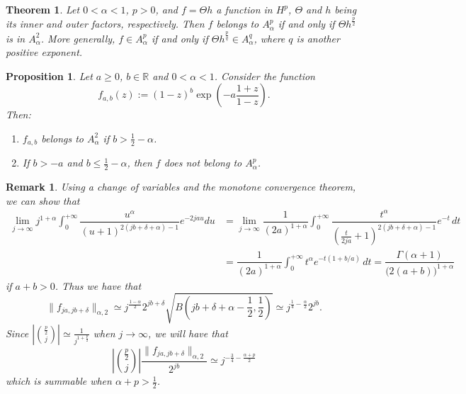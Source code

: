 \documentclass[10pt,a4paper]{amsart}
\newtheorem{theorem}{Theorem}
\newtheorem{proposition}{Proposition}
\newtheorem{remark}{Remark}
\newcommand{\R}{\mathbb{{R}}}
\begin{document}
        \begin{theorem}
        \label{theo:p/2}
            Let $0<\alpha<1$, $p>0$, and $f=\Theta h$ a function in $H^p$, $\Theta$ and $h$ being its inner and outer factors, respectively. Then $f$ belongs to $A^p_\alpha$ if and only if $\Theta h^\frac{p}{2}$ is in $A^2_\alpha$. More generally, $f \in A^p_\alpha$ if and only if $\Theta h^{\frac{p}{q}} \in A^q_\alpha$, where $q$ is another positive exponent.
        \end{theorem}

        \begin{proposition} \label{Prop:BS}
            Let $a \ge 0$, $b \in \R$ and $0<\alpha<1$. Consider the function
                \[
                    f_{a, b}(z) := (1-z)^b\exp\left(-a\frac{1+z}{1-z}\right).
                \]
                Then:
                \begin{enumerate}
                    \item \label{Propi)} $f_{a, b}$ belongs to $A_\alpha^2$ if $b > \frac{1}{2} - \alpha$.
                    
                    \item \label{Propii)} If $b>-a$ and $b\le\frac{1}{2}-\alpha$, then $f$ does not belong to $A^p_\alpha$.
                \end{enumerate}
        \end{proposition}

        \begin{remark} \label{rem:power_est}
            Using a change of variables and the monotone convergence theorem, we can show that
                \begin{align*}
                    \lim_{j \to \infty} j^{1 + \alpha} \int_0^{+\infty} \dfrac{u^\alpha}{(u + 1)^{2(jb + \delta + \alpha) - 1}} e^{-2jau} du & = \lim_{j \to \infty} \dfrac{1}{(2a)^{1 + \alpha}} \int_0^{+\infty} \dfrac{t^{\alpha}}{ \left( \frac{t}{2ja} + 1 \right)^{2(jb+\delta + \alpha)-1}} e^{-t} \, dt \\
                        & = \dfrac{1}{(2a)^{1+\alpha}}\int_0^{+\infty} t^\alpha e^{-t (1 + b/a)} \, dt = \dfrac{\Gamma (\alpha + 1)}{\big(2 (a+b) \big)^{1+\alpha}}
                \end{align*}
                if $a + b > 0$. Thus we have that
                \[
                    \|f_{ja, jb+\delta}\|_{\alpha,2} \simeq j^{\frac{1 - \alpha}{2}} 2^{jb + \delta} \sqrt{B \left( jb + \delta + \alpha - \dfrac{1}{2}, \dfrac{1}{2} \right)} \simeq j^{\frac{1}{4} - \frac{\alpha}{2}} 2^{jb}.
                \]
                Since $\left|\binom{\frac{p}{2}}{j}\right|\simeq \frac{1}{j^{1+\frac{p}{2}}}$ when $j \to \infty$, we will have that
                \[
                    \left|\binom{\frac{p}{2}}{j}\right| \dfrac{\|f_{ja, jb+\delta}\|_{\alpha,2}}{2^{jb}} \simeq j^{-\frac{3}{4} - \frac{\alpha + p}{2}}
                \]
                which is summable when $\alpha + p > \frac{1}{2}$.
        \end{remark}
\end{document}
